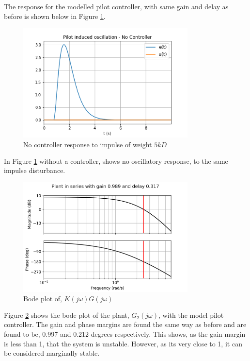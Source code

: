 \documentclass[8pt]{article}
\begin{document}
The response for the modelled pilot controller, with same gain and delay as before is shown below in Figure \ref{fig:figure5}.

\begin{figure}[H]
    \centering
    \includegraphics[width=0.8\textwidth]{figures/FIGURE_5.png}
    \caption{No controller response to impulse of weight $5kD$ }
    \label{fig:figure5}
\end{figure}

In Figure \ref{fig:figure5} without a controller, shows no oscillatory response, to the same impulse disturbance.

\begin{figure}[H]
    \centering
    \includegraphics[width=0.8\textwidth]{figures/FIGURE_6.png}
    \caption{Bode plot of, $K(j\omega)G(j\omega)$}
    \label{fig:figure6}
\end{figure}

Figure \ref{fig:figure6} shows the bode plot of the plant, $G_2(j\omega)$, with the model pilot controller.
The gain and phase margins are found the same way as before and are found to be, 0.997 and 0.212 degrees respectively.
This shows, as the gain margin is less than 1, that the system is unstable. However, as its very close to 1, it can be considered marginally stable.
\end{document}
